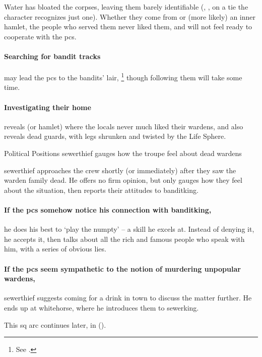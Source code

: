 Water has bloated the corpses, leaving them barely identifiable (, \tn[11], on a tie the character recognizes just one).
Whether they come from  or (more likely) an inner hamlet, the people who served them never liked them, and will not feel ready to cooperate with the \glspl{pc}.

\paragraph{Searching for bandit tracks}
may lead the \glspl{pc} to the bandits' lair,%
\footnote{See .}
though following them will take some time.

\paragraph{Investigating their home}
reveals  (or hamlet) where the locals never much liked their \glspl{warden}, and also reveals dead guards, with legs shrunken and twisted by the Life Sphere.

{Political Positions}%
{\Gls{sewerthief} gauges how the troupe feel about dead \glspl{warden}}%
\label{politicalPositions}

\Gls{sewerthief} approaches the crew shortly (or immediately) after they saw the \gls{warden} family dead.
He offers no firm opinion, but only gauges how they feel about the situation, then reports their attitudes to \gls{banditking}.

\paragraph{If the \glspl{pc} somehow notice his connection with \gls{banditking},}
he does his best to `play the numpty' -- a skill he excels at.
Instead of denying it, he accepts it, then talks about all the rich and famous people who speak with him, with a series of obvious lies.

\paragraph{If the \glspl{pc} seem sympathetic to the notion of murdering unpopular \glspl{warden},}
\gls{sewerthief} suggests coming for a drink in \gls{town} to discuss the matter further.
He ends up at \gls{whitehorse}, where he introduces them to \gls{sewerking}.

\bigLine

This \gls{sq} arc continues later, in  ().

